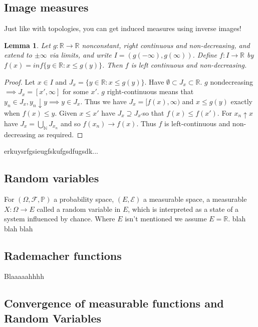 \documentclass{article}
\newtheorem{lemma}[theorem]{Lemma}
\begin{document}
\subsection{Image measures}
Just like with topologies, you can get induced measures using inverse images!
\begin{lemma}
  Let $g:\mathbb R \rightarrow \mathbb R$ nonconstant, right continuous and non-decreasing, and extend to $\pm\infty$ via limits, and write $I=(g(-\infty),g(\infty))$.  Define $f:I\rightarrow\mathbb R$ by $f(x)=inf\{y\in\mathbb R:x\leq g(y)\}$.  Then $f$ is left continuous and non-decreasing.
\end{lemma}
\begin{proof}
  Let $x\in I$ and $J_x=\{y\in\mathbb R:x\leq g(y)\}$.  Have $\emptyset\subset J_x\subset\mathbb R$.  $g$ nondecreasing $\implies J_x=[x',\infty]$ for some $x'$.  $g$ right-continuous means that $y_n\in J_x,y_n\downarrow y \implies y\in J_x$.  Thus we have $J_x=[f(x),\infty)$ and $x\leq g(y)$ exactly when $f(x)\leq y$.  Given $x\leq x'$ have $J_x\supseteq J_{x'}$so that $f(x)\leq f(x')$.  For $x_n\uparrow x$ have $J_x=\bigcup_{\mathbb N}J_{x_n}$ and so $f(x_n)\rightarrow f(x)$.  Thus $f$ is left-continuous and non-decreasing as required.
\end{proof}
erkuysrfgsieugfskufgsdfugsdk...
\subsection{Random variables}
For $(\Omega,\mathcal F, \mathbb P)$ a probability space, $(E,\mathcal E)$ a measurable space, a measurable $X:\Omega\rightarrow E$ called a random variable in $E$, which is interpreted as a state of a system influenced by chance.  Where $E$ isn't mentioned we assume $E=\mathbb R$.
blah blah blah
\subsection{Rademacher functions}
Blaaaaahhhh
\subsection{Convergence of measurable functions and Random Variables}
\end{document}
